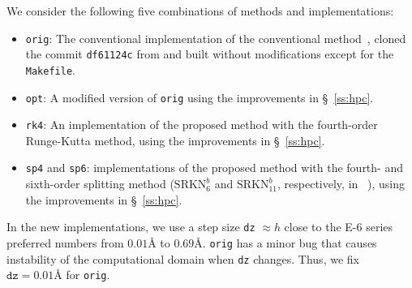 \documentclass[preprint, 5p, times, sort&compress]{elsarticle}
\begin{document}
        We consider the following five combinations of methods and implementations:
        \begin{itemize}
                \item \texttt{orig}: The conventional implementation of the conventional method~\cite{Hanada2022}, cloned the commit \texttt{df61124c} from \cite{str-github} and built without modifications except for the \texttt{Makefile}.
                \item \texttt{opt}: A modified version of \texttt{orig} using the improvements in \S~\ref{ss:hpc}.
                \item \texttt{rk4}: An implementation of the proposed method with the fourth-order Runge-Kutta method, using the improvements in \S~\ref{ss:hpc}.
                \item \texttt{sp4} and \texttt{sp6}: implementations of the proposed method with the fourth- and sixth-order splitting method ($\mathrm{SRKN}_6^b$ and $\mathrm{SRKN}_{11}^b$, respectively, in ~\cite{Blanes2002}),
                using the improvements in \S~\ref{ss:hpc}.
        \end{itemize}
        In the new implementations, we use a step size \texttt{dz} $\approx h$ close to the E-6 series preferred numbers from $0.01\si{\angstrom}$ to $0.69\si{\angstrom}$.
        \texttt{orig} has a minor bug that causes instability of the computational domain when \texttt{dz} changes.
        Thus, we fix $\mathtt{dz}=0.01\si{\angstrom}$ for \texttt{orig}.
\end{document}
